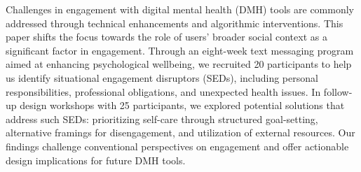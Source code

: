 Challenges in engagement with digital mental health (DMH) tools are commonly addressed through technical enhancements and algorithmic interventions. This paper shifts the focus towards the role of users' broader social context as a significant factor in engagement. Through an eight-week text messaging program aimed at enhancing psychological wellbeing, we recruited 20 participants to help us identify situational engagement disruptors (SEDs), including personal responsibilities, professional obligations, and unexpected health issues. In follow-up design workshops with 25 participants, we explored potential solutions that address such SEDs: prioritizing self-care through structured goal-setting, alternative framings for disengagement, and utilization of external resources. Our findings challenge conventional perspectives on engagement and offer actionable design implications for future DMH tools.